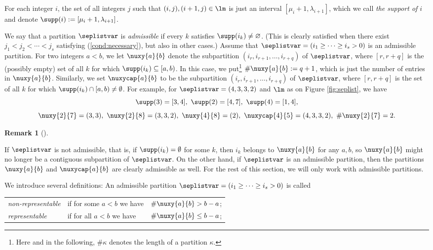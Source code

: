 \documentclass[numbers=enddot,12pt,final,onecolumn,notitlepage]{scrartcl}%
\theoremstyle{definition}
\newtheorem{remk}[theo]{Remark}
\newenvironment{remark}[1][]
{\begin{remk}[#1]\begin{leftbar}}
{\end{leftbar}\end{remk}}
\begin{document}
\def\nuab{\nuxy{a}{b}}
\def\nuabcap{\nuxycap{a}{b}}



For each integer $i$, the set of all integers $j$ such that $(i,j),(i+1,j)\in\lm$ is just an interval $[\mu_{i}+1,\lambda_{i+1}]$, which we call \textit{the support of $i$} and denote $\supp(i):=[\mu_{i}+1,\lambda_{i+1}]$.

We say that a partition $\seplistvar$ is \textit{admissible} if
every $k$ satisfies $\supp(i_k) \neq \varnothing$. (This is
clearly satisfied when there exist $j_1<j_2<\cdots<j_s$
satisfying (\ref{cond:necessary}), but also in other cases.)
Assume that $\seplistvar = \left(i_1 \geq \cdots \geq i_s > 0\right)$ is an admissible partition.
For two integers $a< b$, we let $\nuab$ denote the subpartition $(i_r,i_{r+1},\dots,i_{r+q})$ of $\seplistvar$, where $[r, r+q]$ is the (possibly empty) set of all $k$ for which $\supp(i_k)\subseteq [a,b)$. In this case, we put\footnote{Here and in the following, $\#\kappa$ denotes the length of a partition $\kappa$.} $\#\nuab:=q+1$, which is just the number of entries in $\nuab$. Similarly, we set $\nuabcap$ to be the subpartition $(i_r,i_{r+1},\dots,i_{r+q})$ of $\seplistvar$, where $[r, r+q]$ is the set of all $k$ for which $\supp(i_k)\cap [a,b)\neq\emptyset$.
For example, for $\seplistvar=(4,3,3,2)$ and $\lm$ as on Figure \ref{fig:seplist}, we have 
$$\supp(3)=[3,4],\ \supp(2)=[4,7],\ \supp(4)=[1,4],$$ 
$$\nuxy{2}{7}=(3,3),\ \nuxy{2}{8}=(3,3,2),\ \nuxy{4}{8}=(2),\ \nuxycap{4}{5}=(4,3,3,2),\ \#\nuxy{2}{7}=2.$$

\begin{remark}
 If $\seplistvar$ is not admissible, that is, if $\supp(i_k)=\emptyset$ for some $k$, then $i_k$ belongs to $\nuab$ for any $a,b$, so $\nuab$ might no longer be a contiguous subpartition of $\seplistvar$. On the other hand, if $\seplistvar$ is an admissible partition, then the partitions $\nuab$ and $\nuabcap$ are clearly admissible as well. For the rest of this section, we will only work with admissible partitions.
\end{remark}


We introduce several definitions: An admissible partition $\seplistvar=(i_1\geq \cdots\geq i_s>0)$ is called

\begin{tabular}{@{$\bullet$ }lll}
 \textit{non-representable} & if for some $a<b$ we have & $\#\nuab>b-a$;\\
 \textit{representable}& if for all $a<b$ we have& $\#\nuab\leq b-a$;\\
\end{tabular}
\end{document}
